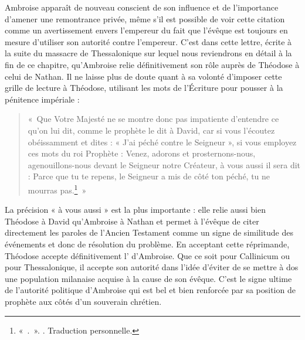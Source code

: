 \bigskip

Ambroise apparaît de nouveau conscient de son influence et de l'importance d'amener une remontrance privée, même s'il est possible de voir cette citation comme un avertissement envers l'empereur du fait que l'évêque est toujours en mesure d'utiliser son autorité contre l'empereur. C'est dans cette lettre, écrite à la suite du massacre de Thessalonique sur lequel nous reviendrons en détail à la fin de ce chapitre, qu'Ambroise relie définitivement son rôle auprès de Théodose à celui de Nathan. Il ne laisse plus de doute quant à sa volonté d'imposer cette grille de lecture à Théodose, utilisant les mots de l'Écriture pour pousser à la pénitence impériale :

\bigskip

\begin{quote}
    «~Que Votre Majesté ne se montre donc pas impatiente d’entendre ce qu’on lui dit, comme le prophète le dit à David, car si vous l’écoutez obéissamment et dites : « J’ai péché contre le Seigneur », si vous employez ces mots du roi Prophète : Venez, adorons et prosternons-nous, agenouillons-nous devant le Seigneur notre Créateur, à vous aussi il sera dit : Parce que tu te repens, le Seigneur a mis de côté ton péché, tu ne mourras pas.\footnote{«~.~». \cite[\nopp ec 11, 7]{ambroise_csel_82_3}. Traduction personnelle.}~»
\end{quote}

\bigskip

La précision « à vous aussi » est la plus importante : elle relie aussi bien Théodose à David qu'Ambroise à Nathan et permet à l'évêque de citer directement les paroles de l'Ancien Testament comme un signe de similitude des événements et donc de résolution du problème. En acceptant cette réprimande, Théodose accepte définitivement l' d'Ambroise. Que ce soit pour Callinicum ou pour Thessalonique, il accepte son autorité dans l'idée d'éviter de se mettre à dos une population milanaise acquise à la cause de son évêque. C'est le signe ultime de l'autorité politique d'Ambroise qui est bel et bien renforcée par sa position de prophète aux côtés d'un souverain chrétien.

